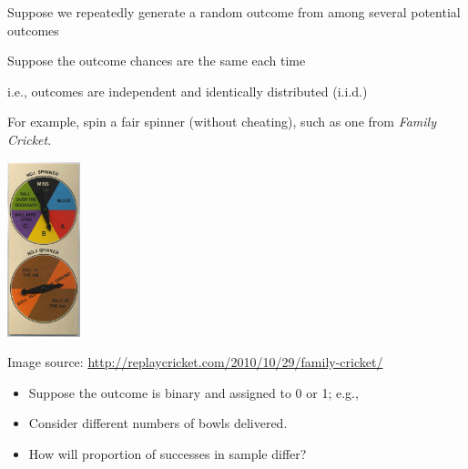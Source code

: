 \documentclass[10pt]{report}
\begin{document}
\noindent
\begin{minipage}[t]{0.69\textwidth}
\vspace*{-1.9in}
\begin{subitemize}
\item Suppose we repeatedly generate a random outcome from among
several potential outcomes
\item Suppose the outcome chances are the same each time
\begin{subsubitemize}
\item i.e., outcomes are independent and identically distributed (i.i.d.)
\end{subsubitemize}
\item For example, spin a fair spinner (without cheating), such as one from \emph{Family Cricket}.
\end{subitemize}
\end{minipage}
%
\begin{minipage}[t]{0.29\textwidth}
\hfill \includegraphics[height=2in]{img/family-cricket-spinner.jpg}
\end{minipage}
\vfill
\hfill {\tiny Image source: \url{http://replaycricket.com/2010/10/29/family-cricket/}}


%
\begin{itemize}
\item Suppose the outcome is binary and assigned to 0 or 1; e.g.,
\item Consider different numbers of bowls delivered.
\item How will proportion of successes in sample differ?
\end{itemize}
\end{document}

